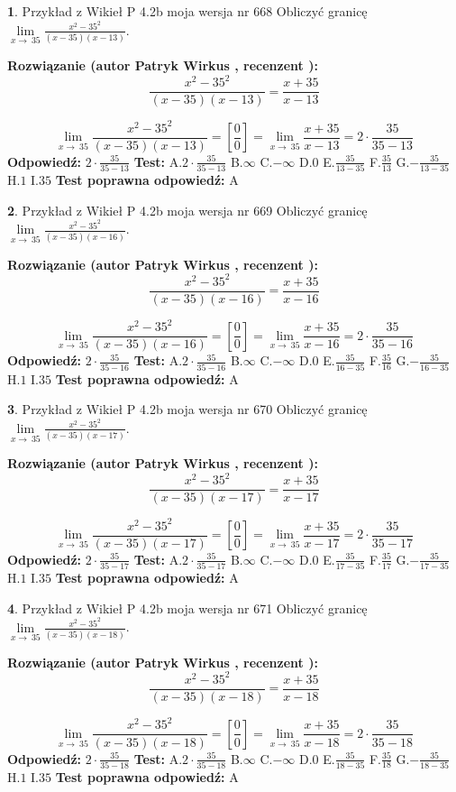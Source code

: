 \documentclass[12pt, a4paper]{article}
\theoremstyle{definition} %
\newtheorem{zad}{}
\newcommand{\zadStart}[1]{\begin{zad}#1\newline}
\newcommand{\zadStop}{\end{zad}}
\newcommand{\rozwStart}[2]{\noindent \textbf{Rozwiązanie (autor #1 , recenzent #2): }\newline}
\newcommand{\rozwStop}{\newline}
\newcommand{\odpStart}{\noindent \textbf{Odpowiedź:}\newline}
\newcommand{\odpStop}{\newline}
\newcommand{\testStart}{\noindent \textbf{Test:}\newline}
\newcommand{\testStop}{\newline}
\newcommand{\kluczStart}{\noindent \textbf{Test poprawna odpowiedź:}\newline}
\newcommand{\kluczStop}{\newline}
\begin{document}
\zadStart{Przykład z Wikieł P 4.2b moja wersja nr 668}
Obliczyć granicę $\lim\limits_{x\to\ 35}\frac{x^{2}-35^{2}}{(x-35)(x-13)}$.
\zadStop
\rozwStart{Patryk Wirkus}{}
$$\frac{x^{2}-35^{2}}{(x-35)(x-13)}=\frac{x+35}{x-13}$$

$$\lim\limits_{x\to\ 35}\frac{x^{2}-35^{2}}{(x-35)(x-13)}=[\frac{0}{0}]=\lim\limits_{x\to\ 35}\frac{x+35}{x-13}=2 \cdot \frac{35}{35-13}$$
\rozwStop
\odpStart
$2 \cdot \frac{35}{35-13}$
\odpStop
\testStart
A.$2 \cdot \frac{35}{35-13}$
B.$\infty$
C.$-\infty$
D.$0$
E.$\frac{35}{13-35}$
F.$\frac{35}{13}$
G.$-\frac{35}{13-35}$
H.$1$
I.$35$
\testStop
\kluczStart
A
\kluczStop



\zadStart{Przykład z Wikieł P 4.2b moja wersja nr 669}
Obliczyć granicę $\lim\limits_{x\to\ 35}\frac{x^{2}-35^{2}}{(x-35)(x-16)}$.
\zadStop
\rozwStart{Patryk Wirkus}{}
$$\frac{x^{2}-35^{2}}{(x-35)(x-16)}=\frac{x+35}{x-16}$$

$$\lim\limits_{x\to\ 35}\frac{x^{2}-35^{2}}{(x-35)(x-16)}=[\frac{0}{0}]=\lim\limits_{x\to\ 35}\frac{x+35}{x-16}=2 \cdot \frac{35}{35-16}$$
\rozwStop
\odpStart
$2 \cdot \frac{35}{35-16}$
\odpStop
\testStart
A.$2 \cdot \frac{35}{35-16}$
B.$\infty$
C.$-\infty$
D.$0$
E.$\frac{35}{16-35}$
F.$\frac{35}{16}$
G.$-\frac{35}{16-35}$
H.$1$
I.$35$
\testStop
\kluczStart
A
\kluczStop



\zadStart{Przykład z Wikieł P 4.2b moja wersja nr 670}
Obliczyć granicę $\lim\limits_{x\to\ 35}\frac{x^{2}-35^{2}}{(x-35)(x-17)}$.
\zadStop
\rozwStart{Patryk Wirkus}{}
$$\frac{x^{2}-35^{2}}{(x-35)(x-17)}=\frac{x+35}{x-17}$$

$$\lim\limits_{x\to\ 35}\frac{x^{2}-35^{2}}{(x-35)(x-17)}=[\frac{0}{0}]=\lim\limits_{x\to\ 35}\frac{x+35}{x-17}=2 \cdot \frac{35}{35-17}$$
\rozwStop
\odpStart
$2 \cdot \frac{35}{35-17}$
\odpStop
\testStart
A.$2 \cdot \frac{35}{35-17}$
B.$\infty$
C.$-\infty$
D.$0$
E.$\frac{35}{17-35}$
F.$\frac{35}{17}$
G.$-\frac{35}{17-35}$
H.$1$
I.$35$
\testStop
\kluczStart
A
\kluczStop



\zadStart{Przykład z Wikieł P 4.2b moja wersja nr 671}
Obliczyć granicę $\lim\limits_{x\to\ 35}\frac{x^{2}-35^{2}}{(x-35)(x-18)}$.
\zadStop
\rozwStart{Patryk Wirkus}{}
$$\frac{x^{2}-35^{2}}{(x-35)(x-18)}=\frac{x+35}{x-18}$$

$$\lim\limits_{x\to\ 35}\frac{x^{2}-35^{2}}{(x-35)(x-18)}=[\frac{0}{0}]=\lim\limits_{x\to\ 35}\frac{x+35}{x-18}=2 \cdot \frac{35}{35-18}$$
\rozwStop
\odpStart
$2 \cdot \frac{35}{35-18}$
\odpStop
\testStart
A.$2 \cdot \frac{35}{35-18}$
B.$\infty$
C.$-\infty$
D.$0$
E.$\frac{35}{18-35}$
F.$\frac{35}{18}$
G.$-\frac{35}{18-35}$
H.$1$
I.$35$
\testStop
\kluczStart
A
\kluczStop
\end{document}
